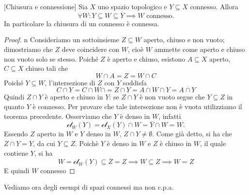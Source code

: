 \begin{theorem}{}[Chiusura e connessione]\label{chiusuraconnessa}
Sia $X$ uno spazio topologico e $Y\subseteq X$ connesso. Allora
		\begin{equation}
			\forall W \colon Y\subseteq W \subseteq \overline{Y} \implies W \text{ connesso}.
		\end{equation}
	In particolare la chiusura di un connesso è connessa.
\end{theorem}
\begin{proof}{n}
	Consideriamo un sottoinsieme $Z\subseteq W$ aperto, chiuso e non vuoto; dimostriamo che $Z$ deve coincidere con $W$, cioè $W$ ammette come aperto e chiuso non vuoto solo se stesso. Poiché $Z$ è aperto e chiuso, esistono $A\subseteq X$ aperto, $C\subseteq X$ chiuso tali che
	\begin{equation*}
		W\cap A=Z=W\cap C
	\end{equation*}
	Poiché $Y\subseteq W$, l'intersezione di $Z$ con $Y$ soddisfa
	\begin{equation*}
		C\cap Y=C\cap W\cap =Z\cap Y=A\cap W\cap Y = A\cap Y
	\end{equation*}
	Quindi $Z\cap Y$ è aperto e chiuso in $Y$: se $Z\cap Y$ è non vuoto segue che $Y\subseteq Z$ in quanto $Y$ è connesso. Per provare che tale intersezione non è vuota utilizziamo il teorema precedente. Osserviamo che $Y$ è denso in $W$, infatti
	\begin{equation*}
		\mathcal{cl}_W(Y)=\mathcal{cl}_X(Y)\cap W=\overline{Y}\cap W=W.
	\end{equation*}
	Essendo $Z$ aperto in $W$ e $Y$ denso in $W$, $Z\cap Y \neq \emptyset$.	Come già detto, si ha che $Z\cap Y=Y$, da cui $Y\subseteq Z$. Poichè $Y$ è denso in $W$ e $Z$ è chiuso in $W$, il quale contiene $Y$, si ha
		\begin{equation*}
			W=\mathcal{cl}_W(Y)\subseteq \overline{Z}=Z \implies W\subseteq Z \implies W=Z
		\end{equation*}
		E quindi $W$ connesso
\end{proof}
Vediamo ora degli esempi di spazi connessi ma non c.p.a.
